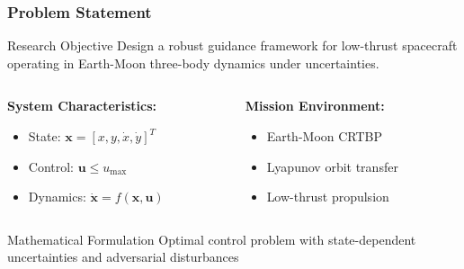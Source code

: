 \begin{frame}
	\frametitle{Problem Statement}
    \vspace{-0.35cm}
	\begin{block}{Research Objective}
		Design a robust guidance framework for low-thrust spacecraft operating in Earth-Moon three-body dynamics under uncertainties.
	\end{block}
	
	\begin{columns}[t]
		\begin{column}{0.5\textwidth}
			\textbf{System Characteristics:}
			\begin{itemize}
				\item State: $\mathbf{x} = [x, y, \dot{x}, \dot{y}]^T$
				\item Control: $\mathbf{u} \leq u_{\max}$
				\item Dynamics: $\dot{\mathbf{x}} = f(\mathbf{x}, \mathbf{u})$
			\end{itemize}
		\end{column}
		\begin{column}{0.5\textwidth}
			\textbf{Mission Environment:}
			\begin{itemize}
				\item Earth-Moon CRTBP
				\item Lyapunov orbit transfer
				\item Low-thrust propulsion
			\end{itemize}
		\end{column}
	\end{columns}
	
    \begin{minipage}
        {0.93\textwidth}
            \begin{exampleblock}{Mathematical Formulation}
		Optimal control problem with state-dependent uncertainties and adversarial disturbances
	\end{exampleblock}
    \end{minipage}
\end{frame}